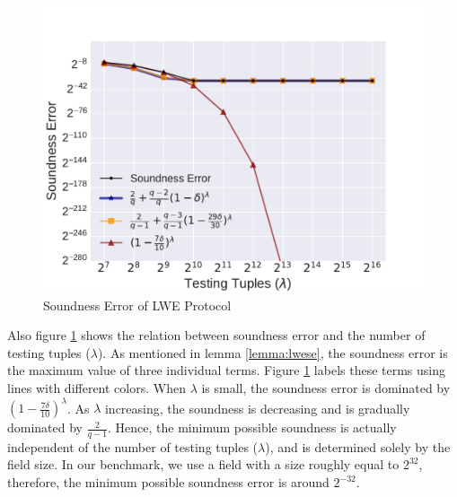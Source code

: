 \begin{figure}[h]
    \centering
    \includegraphics[width=1\textwidth]{graph/se.pdf}
    \caption{Soundness Error of LWE Protocol}
    \label{fig:se}
\end{figure}

Also figure \ref{fig:se} shows the relation between soundness error and the number of testing tuples ($\lambda$). As mentioned in lemma \ref{lemma:lwese}, the soundness error is the maximum value of three individual terms. Figure \ref{fig:se} labels these terms using lines with different colors. When $\lambda$ is small, the soundness error is dominated by $(1 - \frac{7\delta}{10})^\lambda$.
As $\lambda$ increasing, the soundness is decreasing and is gradually dominated by $\frac{2}{q-1}$. Hence, the minimum possible soundness is actually independent of the number of testing tuples ($\lambda$), and is determined solely by the field size. In our benchmark, we use a field with a size roughly equal to $2^{32}$, therefore, the minimum possible soundness error is around $2^{-32}$.
